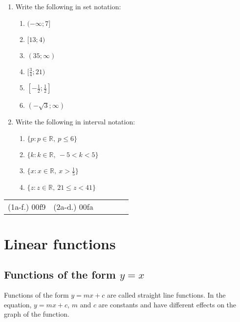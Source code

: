 \begin{exercises}{}
{
\begin{enumerate}[noitemsep, label=\textbf{\arabic*}. ] 
\item Write the following in set notation:
\begin{enumerate}[noitemsep, label=\textbf{(\alph*)} ] 
 \item $(-\infty; 7]$
\item $[13; 4)$
\item $(35; \infty)$
\item $[\frac{3}{4}; 21)$
\item $[-\frac{1}{2}; \frac{1}{2}]$
\item $(-\sqrt{3}; \infty)$
\end{enumerate}

\item Write the following in interval notation:
\begin{enumerate}[noitemsep, label=\textbf{(\alph*)} ] 
 \item $\{p: p \in \mathbb{R},~ p \leq 6\}$
 \item $\{k: k \in \mathbb{R},~ -5 < k < 5\}$
 \item $\{x: x \in \mathbb{R},~ x > \frac{1}{5}\}$
 \item $\{z: z \in \mathbb{R},~ 21 \leq z < 41\}$
\end{enumerate}
\end{enumerate}
\practiceinfo
\par 
\par \begin{tabular}[h]{cccccc}
(1a-f.) 00f9&  (2a-d.) 00fa&  %
\end{tabular}
} 
\end{exercises}


\section{Linear functions}


\subsection*{Functions of the form $y = x$}       
Functions of the form $y=mx+c$ are called straight line functions. In the equation, $y=mx+c$, $m$ and $c$ are constants and have different effects on the graph of the function. 


